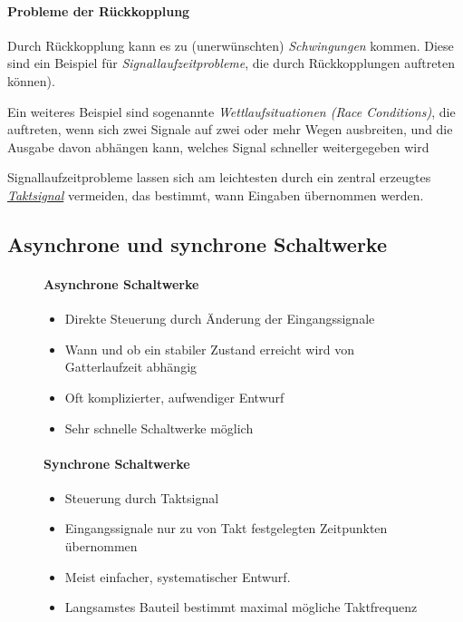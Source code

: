 \documentclass[12pt]{report}
\begin{document}
\paragraph{Probleme der Rückkopplung}

Durch Rückkopplung kann es zu (unerwünschten) \textit{Schwingungen} kommen. 
Diese sind ein Beispiel für \textit{Signallaufzeitprobleme}, die durch Rückkopplungen auftreten können).

Ein weiteres Beispiel sind sogenannte \textit{Wettlaufsituationen (Race Conditions)}, die auftreten, 
wenn sich zwei Signale auf zwei oder mehr Wegen ausbreiten, und die Ausgabe davon abhängen kann, 
welches Signal schneller weitergegeben wird

Signallaufzeitprobleme lassen sich am leichtesten durch ein zentral erzeugtes \underline{\textit{Taktsignal}} vermeiden, 
das bestimmt, wann Eingaben übernommen werden.

\subsection{Asynchrone und synchrone Schaltwerke}

\begin{figure}[H]
  \begin{minipage}[t]{0.45\textwidth}
    \centering
    \paragraph{Asynchrone Schaltwerke}
    \begin{itemize}
      \item Direkte Steuerung durch Änderung der Eingangssignale
      \item Wann und ob ein stabiler Zustand erreicht wird von Gatterlaufzeit abhängig
      \item Oft komplizierter, aufwendiger Entwurf
      \item Sehr schnelle Schaltwerke möglich
    \end{itemize}
  \end{minipage}
  \hfill
  \begin{minipage}[t]{0.45\textwidth}
    \centering
    \paragraph{Synchrone Schaltwerke}
    \begin{itemize}
      \item Steuerung durch Taktsignal
      \item Eingangssignale nur zu von Takt festgelegten Zeitpunkten übernommen
      \item Meist einfacher, systematischer Entwurf.
      \item Langsamstes Bauteil bestimmt maximal mögliche Taktfrequenz
    \end{itemize}
  \end{minipage}
\end{figure}
\end{document}
